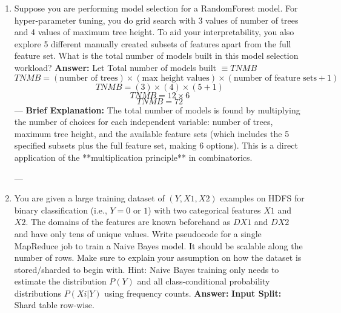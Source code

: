 \documentclass{article}
\begin{document}
\begin{enumerate}[label=\textbf{Question \arabic*.}]
---

\item Suppose you are performing model selection for a RandomForest model. For hyper-parameter tuning, you do grid search with 3 values of number of trees and 4 values of maximum tree height. To aid your interpretability, you also explore 5 different manually created subsets of features apart from the full feature set. What is the total number of models built in this model selection workload?
  \textbf{Answer:}
  Let Total number of models built $\equiv TNMB$
  $$TNMB = (\text{number of trees}) \times (\text{max height values}) \times (\text{number of feature sets}+1)$$
  $$TNMB = (3) \times (4) \times (5+1)$$
  $$TNMB = 12 \times 6$$
  $$TNMB = 72 $$
  ---
  \textbf{Brief Explanation:} The total number of models is found by multiplying the number of choices for each independent variable: number of trees, maximum tree height, and the available feature sets (which includes the 5 specified subsets plus the full feature set, making 6 options). This is a direct application of the **multiplication principle** in combinatorics.

---

\item You are given a large training dataset of $(Y,X1,X2)$ examples on HDFS for binary classification (i.e., $Y = 0$ or $1$) with two categorical features $X1$ and $X2$. The domains of the features are known beforehand as $DX1$ and $DX2$ and have only tens of unique values.
Write pseudocode for a single MapReduce job to train a Naive Bayes model. It should be scalable along the number of rows.
Make sure to explain your assumption on how the dataset is stored/sharded to begin with.
Hint: Naive Bayes training only needs to estimate the distribution $P(Y)$ and all class-conditional probability distributions $P(Xi|Y)$ using frequency counts.
  \textbf{Answer:}
  \textbf{Input Split:} Shard table row-wise.


\end{enumerate}
\end{document}
